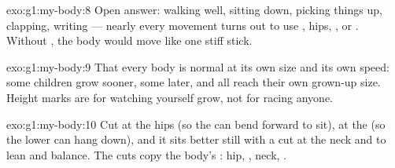 \begin{solution}{exo:g1:my-body:8}
Open answer: walking well, sitting down, picking things up,
clapping, writing --- nearly every movement turns out to use
, hips, ,  or . Without , the body
would move like one stiff stick.
\end{solution}

\begin{solution}{exo:g1:my-body:9}
That every body is normal at its own size and its own speed: some
children grow sooner, some later, and all reach their own grown-up
size. Height marks are for watching yourself grow, not for racing
anyone.
\end{solution}

\begin{solution}{exo:g1:my-body:10}
Cut at the hips (so the  can bend forward to sit), at the
 (so the lower  can hang down), and it sits better still
with a cut at the neck and  to lean and balance. The cuts
copy the body's : hip, , neck, .
\end{solution}
